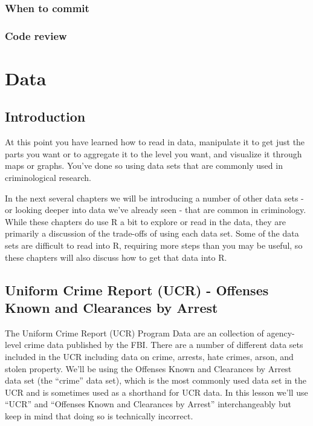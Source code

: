 \documentclass[
  12pt,
]{book}
\begin{document}
\hypertarget{when-to-commit}{%
\section{When to commit}\label{when-to-commit}}

\hypertarget{code-review}{%
\section{Code review}\label{code-review}}

\hypertarget{part-data}{%
\part{Data}\label{part-data}}

\hypertarget{introduction}{%
\chapter{Introduction}\label{introduction}}

At this point you have learned how to read in data, manipulate it to get just the parts you want or to aggregate it to the level you want, and visualize it through maps or graphs. You've done so using data sets that are commonly used in criminological research.

In the next several chapters we will be introducing a number of other data sets - or looking deeper into data we've already seen - that are common in criminology. While these chapters do use R a bit to explore or read in the data, they are primarily a discussion of the trade-offs of using each data set. Some of the data sets are difficult to read into R, requiring more steps than you may be useful, so these chapters will also discuss how to get that data into R.

\hypertarget{ucr}{%
\chapter{Uniform Crime Report (UCR) - Offenses Known and Clearances by Arrest}\label{ucr}}

The Uniform Crime Report (UCR) Program Data are an collection of agency-level crime data published by the FBI. There are a number of different data sets included in the UCR including data on crime, arrests, hate crimes, arson, and stolen property. We'll be using the Offenses Known and Clearances by Arrest data set (the ``crime'' data set), which is the most commonly used data set in the UCR and is sometimes used as a shorthand for UCR data. In this lesson we'll use ``UCR'' and ``Offenses Known and Clearances by Arrest'' interchangeably but keep in mind that doing so is technically incorrect.
\end{document}
